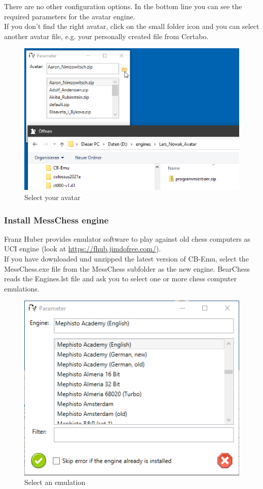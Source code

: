 \documentclass[11pt,a4paper]{article}
\begin{document}
There are no other configuration options. In the bottom line you can see the required parameters for the avatar engine.\\
If you don't find the right avatar, click on the small folder icon and you can select another avatar file, e.g. your personally created file from Certabo.

\begin{figure}[H]
	\centering
	\includegraphics[scale=0.7]{avatar4.png}
	\caption{Select your avatar}
	\label{fig:Avatar4}
\end{figure}

\subsubsection{Install MessChess engine}
Franz Huber provides emulator software to play against old chess computers as UCI engine (look at \url{https://fhub.jimdofree.com/}).\\
If you have downloaded und unzipped the latest version of CB-Emu, select the MessChess.exe file from the MessChess subfolder as the new engine. BearChess reads the Engines.lst file and ask you to select one or more chess computer emulations.

\begin{figure}[H]
	\centering
	\includegraphics[scale=0.8]{MessChess1.png}
	\caption{Select an emulation}
	\label{fig:MessChess1}
\end{figure}
\end{document}
